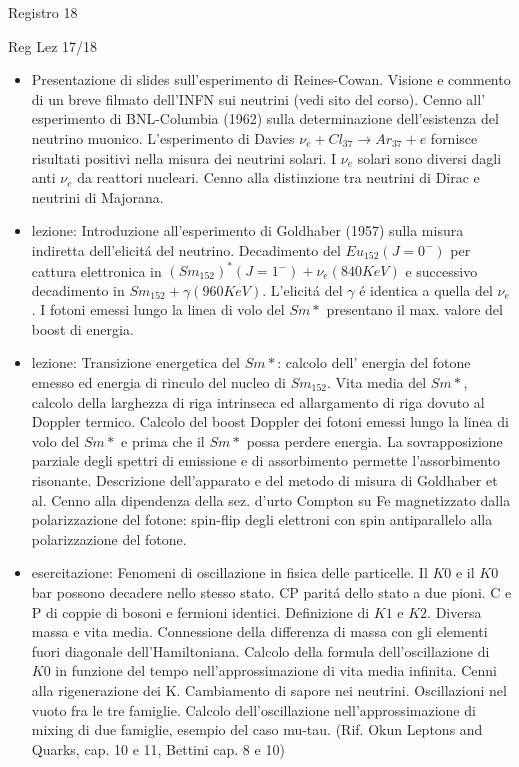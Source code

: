 \begin{frame}{Registro 18}
\begin{frame}[allowframebreaks]{Reg Lez 17/18}
\begin{itemize}
\item  Presentazione di slides sull'esperimento di Reines-Cowan. Visione e commento di un breve filmato dell'INFN sui neutrini (vedi sito del corso). Cenno all' esperimento di BNL-Columbia (1962) sulla determinazione dell'esistenza del neutrino muonico. L'esperimento di Davies $\nu_e+Cl_{37}\to Ar_{37}+e$ fornisce risultati positivi nella misura dei neutrini solari. I $\nu_e$ solari sono diversi dagli anti $\nu_e$ da reattori nucleari. Cenno alla distinzione tra neutrini di Dirac e neutrini di Majorana.

\item  lezione: Introduzione all'esperimento di Goldhaber (1957) sulla misura indiretta dell'elicit\'a del neutrino. Decadimento del $Eu_{152}(J=0^-)$ per cattura elettronica in $(Sm_{152})^*(J=1^-)+\nu_e(840KeV)$ e successivo decadimento in $Sm_{152}+\gamma(960KeV)$. L'elicit\'a del $\gamma$ \'e identica a quella del $\nu_e$. I fotoni emessi lungo la linea di volo del $Sm*$ presentano il max. valore del boost di energia.

\item  lezione: Transizione energetica del $Sm*$: calcolo dell' energia del fotone emesso ed energia di rinculo del nucleo di $Sm_{152}$. Vita media del $Sm*$, calcolo della larghezza di riga intrinseca ed allargamento di riga dovuto al Doppler termico. Calcolo del boost Doppler dei fotoni emessi lungo la linea di volo del $Sm*$ e prima che il $Sm*$ possa perdere energia. La sovrapposizione parziale degli spettri di emissione e di assorbimento permette l'assorbimento risonante. Descrizione dell'apparato e del metodo di misura di Goldhaber et al. Cenno alla dipendenza della sez. d'urto Compton su Fe magnetizzato dalla polarizzazione del fotone: spin-flip degli elettroni con spin antiparallelo alla polarizzazione del fotone.

\item esercitazione: Fenomeni di oscillazione in fisica delle particelle. Il $K0$ e il $K0$bar possono decadere nello stesso stato. CP parit\'a dello stato a due pioni. C e P di coppie di bosoni e fermioni identici. Definizione di $K1$ e $K2$. Diversa massa e vita media. Connessione della differenza di massa con gli elementi fuori diagonale dell'Hamiltoniana. Calcolo della formula dell'oscillazione di $K0$ in funzione del tempo nell'approssimazione di vita media infinita. Cenni alla rigenerazione dei K. Cambiamento di sapore nei neutrini. Oscillazioni nel vuoto fra le tre famiglie. Calcolo dell'oscillazione nell'approssimazione di mixing di due famiglie, esempio del caso mu-tau. (Rif. Okun Leptons and Quarks, cap. 10 e 11, Bettini cap. 8 e 10)


\end{itemize}
\end{frame}
\end{frame}
